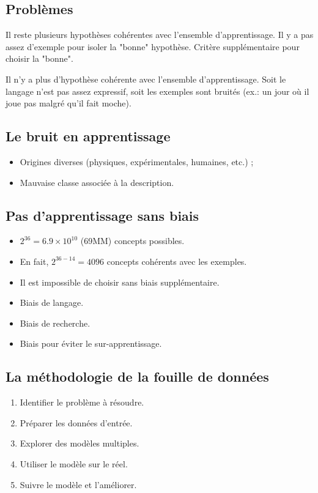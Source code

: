 \subsection{Problèmes}
Il reste plusieurs hypothèses cohérentes avec l'ensemble d'apprentissage. Il y a pas assez d'exemple pour isoler la "bonne" hypothèse. Critère supplémentaire pour choisir la "bonne".

Il n'y a plus d'hypothèse cohérente avec l'ensemble d'apprentissage. Soit le langage n'est pas assez expressif, soit les exemples sont bruités (ex.: un jour où il joue pas malgré qu'il fait moche).

\subsection{Le bruit en apprentissage}
\begin{itemize}
    \item Origines diverses (physiques, expérimentales, humaines, etc.) ;
    \item Mauvaise classe associée à la description.
\end{itemize}

\subsection{Pas d'apprentissage sans biais}
\begin{itemize}
    \item $ 2^{36} = 6.9 \times 10^{10} $ (69MM) concepts possibles.
    \item En fait, $ 2^{36 - 14} = 4096 $ concepts cohérents avec les exemples.
    \item Il est impossible de choisir sans biais supplémentaire.
    \item Biais de langage.
    \item Biais de recherche.
    \item Biais pour éviter le sur-apprentissage.
\end{itemize}

\subsection{La méthodologie de la fouille de données}
\begin{enumerate}
    \item Identifier le problème à résoudre.
    \item Préparer les données d'entrée.
    \item Explorer des modèles multiples.
    \item Utiliser le modèle sur le réel.
    \item Suivre le modèle et l'améliorer.
\end{enumerate}

